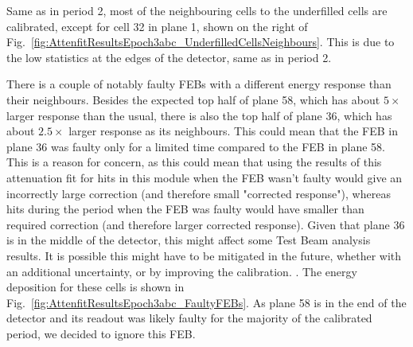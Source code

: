 Same as in period 2, most of the neighbouring cells to the underfilled cells are calibrated, except for cell 32 in plane 1, shown on the right of Fig.~\ref{fig:AttenfitResultsEpoch3abc_UnderfilledCellsNeighbours}. This is due to the low statistics at the edges of the detector, same as in period 2.

There is a couple of notably faulty \gls{FEB}s with a different energy response than their neighbours. Besides the expected top half of plane 58, which has about $5\times$ larger response than the usual, there is also the top half of plane 36, which has about $2.5\times$ larger response as its neighbours. This could mean that the \gls{FEB} in plane 36 was faulty only for a limited time compared to the \gls{FEB} in plane 58. This is a reason for concern, as this could mean that using the results of this attenuation fit for hits in this module when the \gls{FEB} wasn't faulty would give an incorrectly large correction (and therefore small "corrected response"), whereas hits during the period when the \gls{FEB} was faulty would have smaller than required correction (and therefore larger corrected response). Given that plane 36 is in the middle of the detector, this might affect some Test Beam analysis results. It is possible this might have to be mitigated in the future, whether with an additional uncertainty, or by improving the calibration. . The energy deposition for these cells is shown in Fig.~\ref{fig:AttenfitResultsEpoch3abc_FaultyFEBs}. As plane 58 is in the end of the detector and its readout was likely faulty for the majority of the calibrated period, we decided to ignore this \gls{FEB}.

